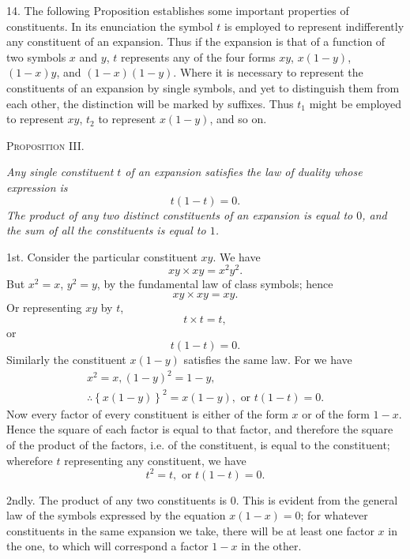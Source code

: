 \documentclass[oneside]{book}
\begin{document}
14. The following Proposition establishes some important
properties of constituents. In its enunciation the symbol $t$ is
employed to represent indifferently any constituent of an expansion.
Thus if the expansion is that of a function of two symbols
$x$ and $y$, $t$ represents any of the four forms $xy$, $x\left(1 - y\right)$, $\left(1 - x\right)y$,
and $\left(1 - x\right)\left(1 - y\right)$. Where it is necessary to represent the constituents
of an expansion by single symbols, and yet to distinguish
them from each other, the distinction will be marked by suffixes.
Thus $t_1$ might be employed to represent $xy$, $t_2$ to represent $x \left(1 - y\right)$,
and so on.

\begin{center}
\textsc{Proposition III.}
\end{center}

\textit{Any single constituent $t$ of an expansion satisfies the law of duality
whose expression is
\[
t\left(1-t\right) = 0.
\]
The product of any two distinct constituents of an expansion is equal
to $0$, and the sum of all the constituents is equal to $1$.}

1st. Consider the particular constituent $xy$. We have
\[
xy \times xy = x^2y^2.
\]
But $x^2 = x$, $y^2 = y$, by the fundamental law of class symbols;
hence
\[
xy \times xy = xy.
\]
Or representing $xy$ by $t$,
\[
t \times t = t,
\]
or
\[
t\left(1 -t\right) = 0.
\]
Similarly the constituent $x \left(1 - y\right)$ satisfies the same law. For we
have
\begin{eqnarray*}
x^2 = x, \left(1 - y\right)^2 = 1 - y, \\
\therefore \left\{x\left(1-y\right)\right\}^2 = x\left(1-y\right), \textrm{ or } t\left(1-t\right) = 0.
\end{eqnarray*}
Now every factor of every constituent is either of the form $x$ or
of the form $1 - x$. Hence the square of each factor is equal to that
factor, and therefore the square of the product of the factors, i.e.
of the constituent, is equal to the constituent; wherefore $t$ representing
any constituent, we have
\[
t^2 = t, \textrm{ or } t\left(1 -t\right) = 0.
\]

2ndly. The product of any two constituents is $0$. This is
evident from the general law of the symbols expressed by the
equation $x \left(1 - x\right) = 0$; for whatever constituents in the same expansion
we take, there will be at least one factor $x$ in the one, to
which will correspond a factor $1 - x$ in the other.
\end{document}
